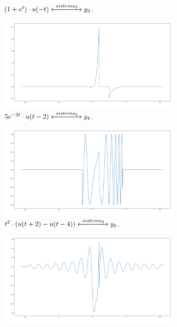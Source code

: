 \begin{figure}[H]
\begin{subfigure}[b]{0.5\linewidth}
        \caption{\( (1+e^t) \cdot u(-t) \xleftrightarrow[]{\ sistema_2\ } y_3\).} 
        \label{fig:exemplo3} 
    \end{subfigure}%
    \begin{subfigure}[b]{0.5\linewidth}
        \centering
        \includegraphics[width=1\linewidth]{prints/exemplo_4.png} 
        \caption{\( 5e^{-2t} \cdot u(t-2) \xleftrightarrow[]{\ sistema_2\ } y_4\).} 
        \label{fig:exemplo4} 
    \end{subfigure}
    \begin{subfigure}[b]{0.5\linewidth}
        \centering
        \includegraphics[width=1\linewidth]{prints/exemplo_5.png}
        \caption{\( t^2 \cdot (u(t+2) - u(t-4)) \xleftrightarrow[]{\ sistema_2\ } y_5\).} 
        \label{fig:exemplo5} 
    \end{subfigure}%
    \begin{subfigure}[b]{0.5\linewidth}
        \centering
        \includegraphics[width=1\linewidth]{prints/exemplo_6.png} 

\end{subfigure}
\end{figure}
